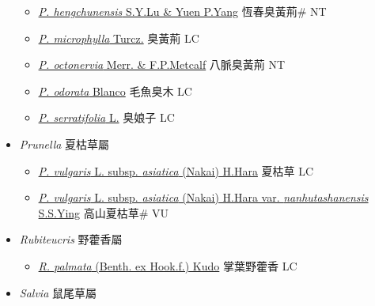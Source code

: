 \begin{itemize}
  \begin{itemize}
        \item[] \href{http://www.theplantlist.org/tpl1.1/search?q=Premna+hengchunensis}{\textit{P. hengchunensis} S.Y.Lu \& Yuen P.Yang}   恆春臭黃荊\# NT
        \item[] \href{http://www.theplantlist.org/tpl1.1/search?q=Premna+microphylla}{\textit{P. microphylla} Turcz.}   臭黃荊 LC
        \item[] \href{http://www.theplantlist.org/tpl1.1/search?q=Premna+octonervia}{\textit{P. octonervia} Merr. \& F.P.Metcalf}   八脈臭黃荊 NT
        \item[] \href{http://www.theplantlist.org/tpl1.1/search?q=Premna+odorata}{\textit{P. odorata} Blanco}   毛魚臭木 LC
        \item[] \href{http://www.theplantlist.org/tpl1.1/search?q=Premna+serratifolia}{\textit{P. serratifolia} L.}   臭娘子 LC
  \end{itemize}
 \item[] \textit{Prunella} 夏枯草屬
                    
  \begin{itemize}
        \item[] \href{http://www.theplantlist.org/tpl1.1/search?q=Prunella+vulgaris+subsp.+asiatica}{\textit{P. vulgaris} L. subsp. \textit{asiatica} (Nakai) H.Hara}   夏枯草 LC
        \item[] \href{http://www.theplantlist.org/tpl1.1/search?q=Prunella+vulgaris+subsp.+asiatica+var.+nanhutashanensis}{\textit{P. vulgaris} L. subsp. \textit{asiatica} (Nakai) H.Hara var. \textit{nanhutashanensis} S.S.Ying}   高山夏枯草\# VU
  \end{itemize}
 \item[] \textit{Rubiteucris} 野藿香屬
                    
  \begin{itemize}
        \item[] \href{http://www.theplantlist.org/tpl1.1/search?q=Rubiteucris+palmata}{\textit{R. palmata} (Benth. ex Hook.f.) Kudo}   掌葉野藿香 LC
  \end{itemize}
 \item[] \textit{Salvia} 鼠尾草屬
                    

\end{itemize}
